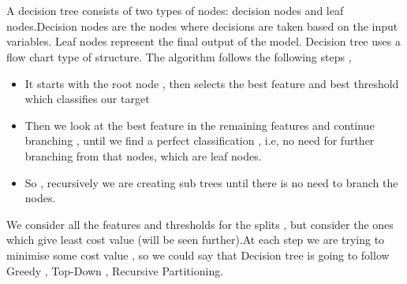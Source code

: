 \documentclass[12pt,a4paper]{article}
\begin{document}
\section{}
A decision tree consists of two types of nodes: decision nodes and leaf nodes.Decision nodes are the nodes where decisions are taken based on the input variables. Leaf nodes represent the final output of the model. Decision tree uses a flow chart type of structure. The algorithm follows the following steps , 
\begin{itemize}
    \item It starts with the root node , then selects the best feature and best threshold which classifies our target
    \item Then we look at the best feature in the remaining features and continue branching , until we find a perfect classification , i.e, no need for further branching from that nodes, which are leaf nodes.
    \item So , recursively we are creating sub trees until there is no need to branch the nodes.
\end{itemize}
We consider all the features and thresholds for the splits , but consider the ones which give least cost value (will be seen further).At each step we are trying to minimise some cost value , so we could say that  Decision tree is going to follow Greedy , Top-Down , Recursive Partitioning.
\end{document}
